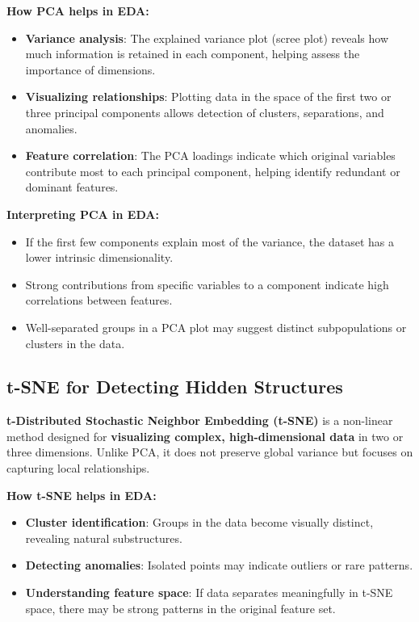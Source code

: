 \documentclass[12pt,openany]{book}
\begin{document}
\textbf{How PCA helps in EDA:}
\begin{itemize}
    \item \textbf{Variance analysis}: The explained variance plot (scree plot) reveals how much information is retained in each component, helping assess the importance of dimensions.
    \item \textbf{Visualizing relationships}: Plotting data in the space of the first two or three principal components allows detection of clusters, separations, and anomalies.
    \item \textbf{Feature correlation}: The PCA loadings indicate which original variables contribute most to each principal component, helping identify redundant or dominant features.
\end{itemize}

\textbf{Interpreting PCA in EDA:}
\begin{itemize}
    \item If the first few components explain most of the variance, the dataset has a lower intrinsic dimensionality.
    \item Strong contributions from specific variables to a component indicate high correlations between features.
    \item Well-separated groups in a PCA plot may suggest distinct subpopulations or clusters in the data.
\end{itemize}

\subsection{t-SNE for Detecting Hidden Structures}

\textbf{t-Distributed Stochastic Neighbor Embedding (t-SNE)} is a non-linear method designed for \textbf{visualizing complex, high-dimensional data} in two or three dimensions. Unlike PCA, it does not preserve global variance but focuses on capturing local relationships.

\textbf{How t-SNE helps in EDA:}
\begin{itemize}
    \item \textbf{Cluster identification}: Groups in the data become visually distinct, revealing natural substructures.
    \item \textbf{Detecting anomalies}: Isolated points may indicate outliers or rare patterns.
    \item \textbf{Understanding feature space}: If data separates meaningfully in t-SNE space, there may be strong patterns in the original feature set.
\end{itemize}
\end{document}
